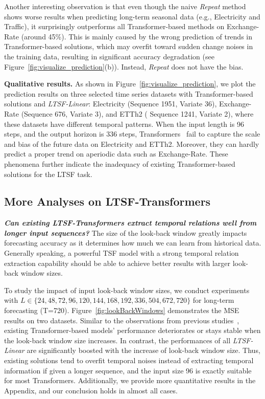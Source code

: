 \documentclass[10pt,twocolumn,letterpaper]{article}
\newcommand{\modelname}{\emph{LTSF-Linear}\xspace}
\begin{document}
Another interesting observation is that even though the naive \emph{Repeat} method shows worse results when predicting long-term seasonal data (e.g., Electricity and Traffic), it surprisingly outperforms all Transformer-based methods on Exchange-Rate (around 45\%). 
This is mainly caused by the wrong prediction of trends in Transformer-based solutions, which may overfit toward sudden change noises in the training data, resulting in significant accuracy degradation (see Figure~\ref{fig:visualize_prediction}(b)). Instead, \emph{Repeat} does not have the bias.


\textbf{Qualitative results.}
As shown in Figure~\ref{fig:visualize_prediction}, we plot the prediction results on three selected time series datasets with Transformer-based solutions and \modelname: Electricity (Sequence 1951, Variate 36), Exchange-Rate (Sequence 676, Variate 3), and ETTh2 ( Sequence 1241, Variate 2), where these datasets have different temporal patterns. When the input length is 96 steps, and the output horizon is 336 steps, Transformers~\cite{informer,xu2021autoformer,zhou2022fedformer} fail to capture the scale and bias of the future data on Electricity and ETTh2. Moreover, they can hardly predict a proper trend on aperiodic data such as Exchange-Rate. These phenomena further indicate the inadequacy of existing Transformer-based solutions for the LTSF task.



\subsection{More Analyses on LTSF-Transformers}
\label{subsec:TransformerModelDesign}

\textbf{\emph{Can existing LTSF-Transformers extract temporal relations well from longer input sequences?}}
The size of the look-back window greatly impacts forecasting accuracy as it determines how much we can learn from historical data. Generally speaking, a powerful TSF model with a strong temporal relation extraction capability should be able to achieve better results with larger look-back window sizes.


To study the impact of input look-back window sizes, we conduct experiments with $L \in \{24, 48, 72, 96, 120, 144, 168, 192, 336, 504, 672, 720\}$ for long-term forecasting (T=720).
Figure~\ref{fig:lookBackWindows} demonstrates the MSE results on two datasets. 
Similar to the observations from previous studies~\cite{informer,wen2022transformers}, existing Transformer-based models' performance deteriorates or stays stable when the look-back window size increases. In contrast, the performances of all \modelname are significantly boosted with the increase of look-back window size. 
Thus, existing solutions tend to overfit temporal noises instead of extracting temporal information if given a longer sequence, and the input size 96 is exactly suitable for most Transformers.
Additionally, we provide more quantitative results in the Appendix, and our conclusion holds in almost all cases. 
\end{document}
